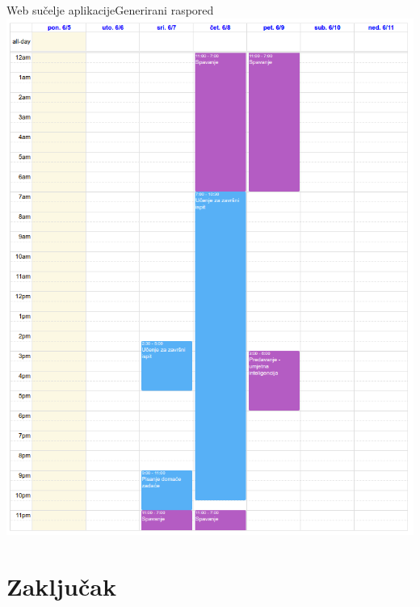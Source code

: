 \documentclass{beamer}
\begin{document}
\begin{frame}{Web sučelje aplikacije}{Generirani raspored}
\centering
\includegraphics[totalheight=0.8\textheight]{../TeX/resources/graphics/screenshot-raspored-1.png}
\end{frame}

\section*{Zaključak}
\end{document}
